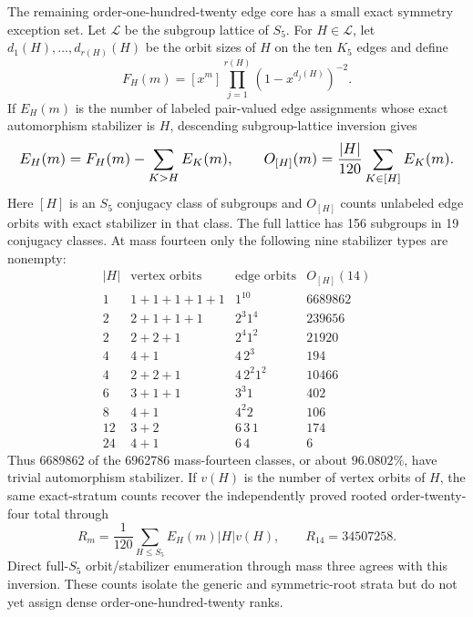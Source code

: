 \documentclass{article}
\newcommand{\fitmath}[1]{\resizebox{0.99\linewidth}{!}{$\displaystyle #1$}}
\begin{document}
The remaining order-one-hundred-twenty edge core has a small exact symmetry
exception set. Let $\mathcal L$ be the subgroup lattice of $S_5$. For
$H\in\mathcal L$, let $d_1(H),\ldots,d_{r(H)}(H)$ be the orbit sizes of $H$ on
the ten $K_5$ edges and define
\[
  F_H(m)=[x^m]\prod_{j=1}^{r(H)}(1-x^{d_j(H)})^{-2}.
\]
If $E_H(m)$ is the number of labeled pair-valued edge assignments whose exact
automorphism stabilizer is $H$, descending subgroup-lattice inversion gives
\begin{equation}
  \fitmath{%
    E_H(m)=F_H(m)-\sum_{K>H}E_K(m),
    \qquad
    O_{[H]}(m)=\frac{|H|}{120}\sum_{K\in[H]}E_K(m).
  }
  \label{eq:optimization-crazy-preimage-cube-quintuple-s5-stabilizer-spectrum}
\end{equation}
Here $[H]$ is an $S_5$ conjugacy class of subgroups and $O_{[H]}$ counts
unlabeled edge orbits with exact stabilizer in that class. The full lattice has
156 subgroups in 19 conjugacy classes. At mass fourteen only the following nine
stabilizer types are nonempty:
\[
\begin{array}{c|c|c|r}
|H| & \text{vertex orbits} & \text{edge orbits} & O_{[H]}(14)\\ \hline
1  & 1+1+1+1+1 & 1^{10}       & 6689862\\
2  & 2+1+1+1   & 2^3 1^4      & 239656\\
2  & 2+2+1     & 2^4 1^2      & 21920\\
4  & 4+1       & 4\,2^3       & 194\\
4  & 2+2+1     & 4\,2^2 1^2   & 10466\\
6  & 3+1+1     & 3^3 1        & 402\\
8  & 4+1       & 4^2 2        & 106\\
12 & 3+2       & 6\,3\,1      & 174\\
24 & 4+1       & 6\,4          & 6
\end{array}
\]
Thus 6689862 of the 6962786 mass-fourteen classes, or about $96.0802\%$, have
trivial automorphism stabilizer. If $v(H)$ is the number of vertex orbits of
$H$, the same exact-stratum counts recover the independently proved rooted
order-twenty-four total through
\[
  R_m=\frac1{120}\sum_{H\leq S_5}E_H(m)|H|v(H),
  \qquad R_{14}=34507258.
\]
Direct full-$S_5$ orbit/stabilizer enumeration through mass three agrees with
this inversion. These counts isolate the generic and symmetric-root strata but
do not yet assign dense order-one-hundred-twenty ranks.
\end{document}
